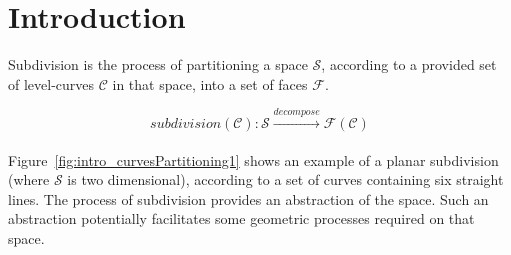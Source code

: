 \section{Introduction}
Subdivision is the process of partitioning a space $\mathcal{S}$, according to a provided set of level-curves $\mathcal{C}$ in that space, into a set of faces $\mathcal{F}$.

\[ \mathit{subdivision}(\mathcal{C}): \mathcal{S} \xrightarrow[]{decompose} \mathcal{F}\left(\mathcal{C}\right) \]

Figure~\ref{fig:intro_curvesPartitioning1} shows an example of a planar subdivision (where $\mathcal{S}$ is two dimensional), according to a set of curves containing six straight lines.
The process of subdivision provides an abstraction of the space.
Such an abstraction potentially facilitates some geometric processes required on that space.

